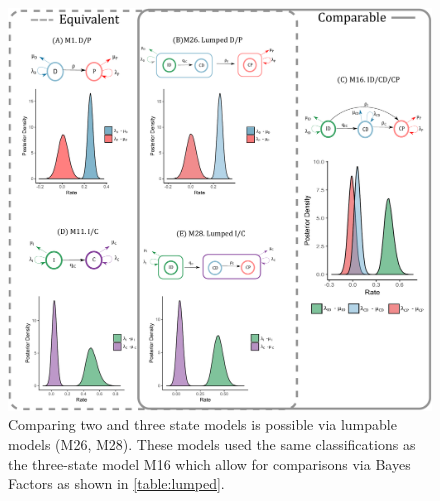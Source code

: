 \begin{figure}
\includegraphics[width=\textwidth]{lumped.pdf} %
\caption{Comparing two and three state models is possible via lumpable models (M26, M28). These models used the same classifications as the three-state model M16 which allow for comparisons via Bayes Factors as shown in \cref{table:lumped}.}  
\label{figure:lumped}
\end{figure}

